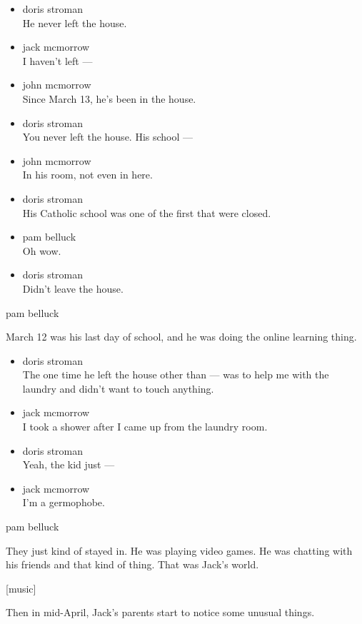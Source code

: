 \begin{itemize}
\item
  doris stroman\\
  He never left the house.
\item
  jack mcmorrow\\
  I haven't left ---
\item
  john mcmorrow\\
  Since March 13, he's been in the house.
\item
  doris stroman\\
  You never left the house. His school ---
\item
  john mcmorrow\\
  In his room, not even in here.
\item
  doris stroman\\
  His Catholic school was one of the first that were closed.
\item
  pam belluck\\
  Oh wow.
\item
  doris stroman\\
  Didn't leave the house.
\end{itemize}

pam belluck

March 12 was his last day of school, and he was doing the online
learning thing.

\begin{itemize}
\item
  doris stroman\\
  The one time he left the house other than --- was to help me with the
  laundry and didn't want to touch anything.
\item
  jack mcmorrow\\
  I took a shower after I came up from the laundry room.
\item
  doris stroman\\
  Yeah, the kid just ---
\item
  jack mcmorrow\\
  I'm a germophobe.
\end{itemize}

pam belluck

They just kind of stayed in. He was playing video games. He was chatting
with his friends and that kind of thing. That was Jack's world.

{[}music{]}

Then in mid-April, Jack's parents start to notice some unusual things.

